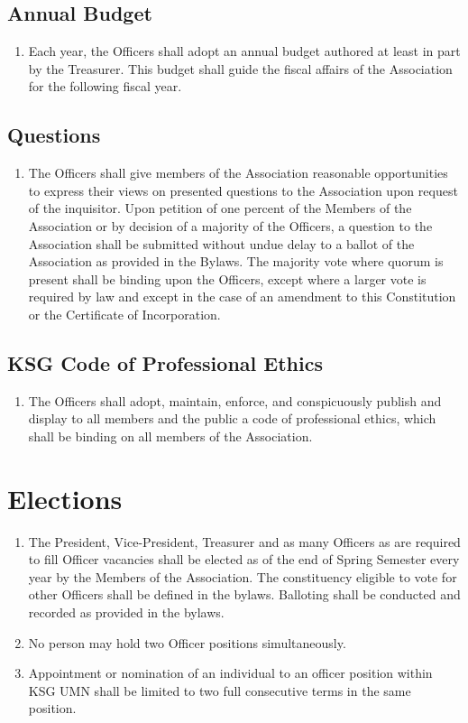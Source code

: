 \documentclass[12pt,letterpaper]{article}
\begin{document}
\subsection{Annual Budget}
\begin{enumerate}
  \item Each year, the Officers shall adopt an annual budget authored at least in
        part by the Treasurer. This budget shall guide the fiscal affairs of the
        Association for the following fiscal year.
\end{enumerate}

\subsection{Questions}
\begin{enumerate}
  \item The Officers shall give members of the Association reasonable opportunities
        to express their views on presented questions to the Association upon request
        of the inquisitor. Upon petition of one percent of the Members of the
        Association or by decision of a majority of the Officers, a question to the
        Association shall be submitted without undue delay to a ballot of the
        Association as provided in the Bylaws. The majority vote where quorum is
        present shall be binding upon the Officers, except where a larger vote is
        required by law and except in the case of an amendment to this Constitution
        or the Certificate of Incorporation.
\end{enumerate}

\subsection{KSG Code of Professional Ethics}
\begin{enumerate}
  \item The Officers shall adopt, maintain, enforce, and conspicuously publish and
        display to all members and the public a code of professional ethics, which
        shall be binding on all members of the Association.
\end{enumerate}

\section{Elections}
\begin{enumerate}
  \item The President, Vice-President, Treasurer and as many Officers as are required to fill
        Officer vacancies shall be elected as of the end of Spring Semester every
        year by the Members of the Association. The constituency eligible to vote for
        other Officers shall be defined in the bylaws. Balloting shall be conducted
        and recorded as provided in the bylaws.
  \item No person may hold two Officer positions simultaneously.
  \item Appointment or nomination of an individual to an officer position within KSG
        UMN shall be limited to two full consecutive terms in the same position.
\end{enumerate}
\end{document}
